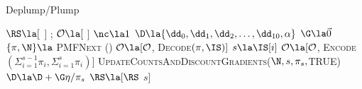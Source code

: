 \begin{algorithm}[t!]
    \caption{Deplump/Plump} \label{alg:deplump/plump}
    \begin{algorithmic}[1]
		\State $\RS \la [$ $]$ ;  $\mathcal{O} \la  [$ $]$%
		\State $\nc \la 1$ 
		\State $\D \la  \{ \dd_0, \dd_1, \dd_2, \dots, \dd_{10}, \alpha \}$ 
			\State $\G \la \vec 0$ 
			\State $ \{ \pi, \N  \} \la$  \textsc{PMFNext} (\RS)
				\State $\mathcal{O} \la [\mathcal{O}$,  \textsc{Decode}$(\pi, \IS)]$
			\Else
				\State $s \la \IS[i]$
				\State $\mathcal{O}\la [\mathcal{O}$,   \textsc{Encode}$(\Sigma_{i = 1}^{s-1} \pi_i, \Sigma_{i = 1}^{s} \pi_i)]$		
			\EndIf
			\State \textsc{UpdateCountsAndDiscountGradients}($\N,s,\pi_s,$TRUE)
			\State $\D \la \D + \G \eta / \pi_s$ 
			\State $\RS \la [\RS$ $s]$ 
		\EndFor
	\EndProcedure
	\end{algorithmic}
\end{algorithm}

